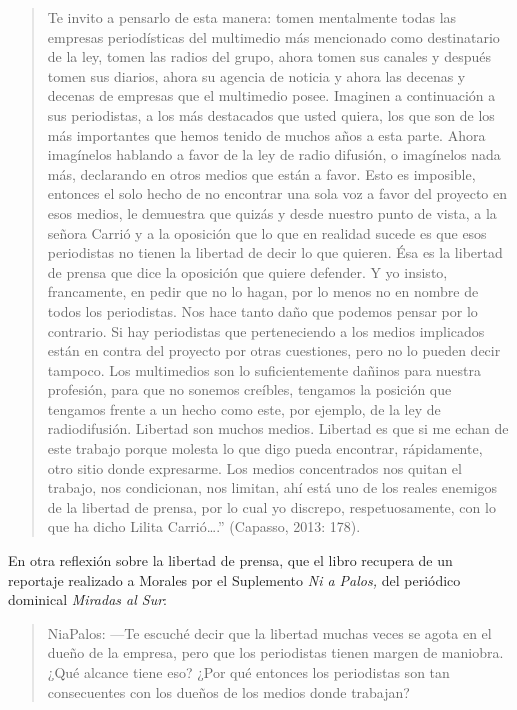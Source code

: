 {\begin{quote}
Te invito a pensarlo de esta manera: tomen mentalmente todas las empresas periodísticas del multimedio más mencionado como destinatario de la ley, tomen las radios del grupo, ahora tomen sus canales y después tomen sus diarios, ahora su agencia de noticia y ahora las decenas y decenas de empresas que el multimedio posee. Imaginen a continuación a sus periodistas, a los más destacados que usted quiera, los que son de los más importantes que hemos tenido de muchos años a esta parte. Ahora imagínelos hablando a favor de la ley de radio difusión, o imagínelos nada más, declarando en otros medios que están a favor. Esto es imposible, entonces el solo hecho de no encontrar una sola voz a favor del proyecto en esos medios, le demuestra que quizás y desde nuestro punto de vista, a la señora Carrió y a la oposición que lo que en realidad sucede es que esos periodistas no tienen la libertad de decir lo que quieren. Ésa es la libertad de prensa que dice la oposición que quiere defender. Y yo insisto, francamente, en pedir que no lo hagan, por lo menos no en nombre de todos los periodistas. Nos hace tanto daño que podemos pensar por lo contrario. Si hay periodistas que perteneciendo a los medios implicados están en contra del proyecto por otras cuestiones, pero no lo pueden decir tampoco. Los multimedios son lo suficientemente dañinos para nuestra profesión, para que no sonemos creíbles, tengamos la posición que tengamos frente a un hecho como este, por ejemplo, de la ley de radiodifusión. Libertad son muchos medios. Libertad es que si me echan de este trabajo porque molesta lo que digo pueda encontrar, rápidamente, otro sitio donde expresarme. Los medios concentrados nos quitan el trabajo, nos condicionan, nos limitan, ahí está uno de los reales enemigos de la libertad de prensa, por lo cual yo discrepo, respetuosamente, con lo que ha dicho Lilita Carrió\ldots.'' (Capasso, 2013: 178).
\end{quote}

En otra reflexión sobre la libertad de prensa, que el libro recupera de un reportaje realizado a Morales por el Suplemento \emph{Ni a Palos,} del periódico dominical \emph{Miradas al Sur}:

\begin{quote}
NiaPalos: ---Te escuché decir que la libertad muchas veces se agota en el dueño de la empresa, pero que los periodistas tienen margen de maniobra. ¿Qué alcance tiene eso? ¿Por qué entonces los periodistas son tan consecuentes con los dueños de los medios donde trabajan?


\end{quote}}
